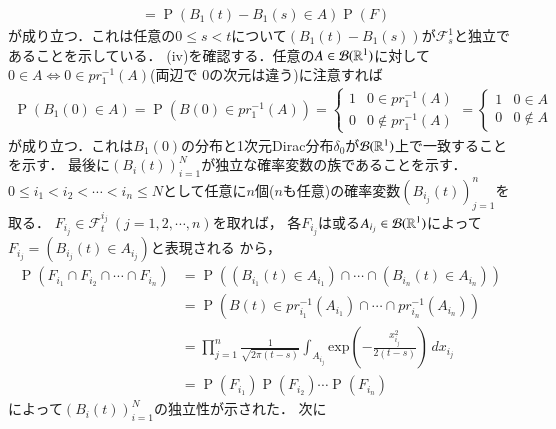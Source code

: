 \begin{prf}
\begin{description}
\begin{align}
			&= \operatorname{P}\left( B_1(t) - B_1(s) \in A\right) \operatorname{P}(F)
		\end{align}
		が成り立つ．これは任意の$0 \leq s < t$について$(B_1(t) - B_1(s))$が$\mathcal{F}_s^1$と独立であることを示している．
		(iv)を確認する．任意の$A \in \mathcal{B}(\mathbb{R}^1)$に対して$0 \in A \Leftrightarrow 0 \in pr_1^{-1}(A)$(両辺で
		0の次元は違う)に注意すれば
		\begin{align}
			\operatorname{P}(B_1(0) \in A) = \operatorname{P}(B(0) \in pr_1^{-1}(A))
			= \begin{cases}
				1 & 0 \in pr_1^{-1}(A) \\
				0 & 0 \notin pr_1^{-1}(A)
			\end{cases}
			= \begin{cases}
				1 & 0 \in A \\
				0 & 0 \notin A
			\end{cases}
		\end{align}
		が成り立つ．これは$B_1(0)$の分布と1次元Dirac分布$\delta_0$が$\mathcal{B}(\mathbb{R}^1)$上で一致することを示す．
		最後に$(B_i(t))_{i=1}^{N}$が独立な確率変数の族であることを示す．
		$0 \leq i_1 < i_2 < \cdots < i_n \leq N$として任意に$n$個($n$も任意)の確率変数$(B_{i_j}(t))_{j=1}^{n}$を取る．
		$F_{i_j} \in \mathcal{F}_t^{i_j}\ (j=1,2,\cdots,n)$を取れば，
		各$F_{i_j}$は或る$A_{i_j} \in \mathcal{B}(\mathbb{R}^1)$によって$F_{i_j} = \left(B_{i_j}(t) \in A_{i_j} \right)$と表現される
		から，
		\begin{align}
			\operatorname{P}\left(F_{i_1} \cap F_{i_2} \cap \cdots \cap F_{i_n}\right)
			&= \operatorname{P}\left( \left(B_{i_1}(t) \in A_{i_1} \right) \cap \cdots \cap \left(B_{i_n}(t) \in A_{i_n} \right)\right) \\
			&= \operatorname{P}\left( B(t) \in pr_{i_1}^{-1}(A_{i_1}) \cap \cdots \cap pr_{i_n}^{-1}(A_{i_n})\right) \\
			&= \prod_{j=1}^{n} \frac{1}{\sqrt{2 \pi (t-s)}} \int_{A_{i_j}} \mathrm{exp} \left( -\frac{x_{i_j}^2}{2(t-s)} \right)\, dx_{i_j} \\
			&= \operatorname{P}\left(F_{i_1}\right) \operatorname{P}\left(F_{i_2}\right) \cdots \operatorname{P}\left(F_{i_n}\right)
		\end{align}
		によって$(B_i(t))_{i=1}^{N}$の独立性が示された．
		次に
\end{description}
\end{prf}
